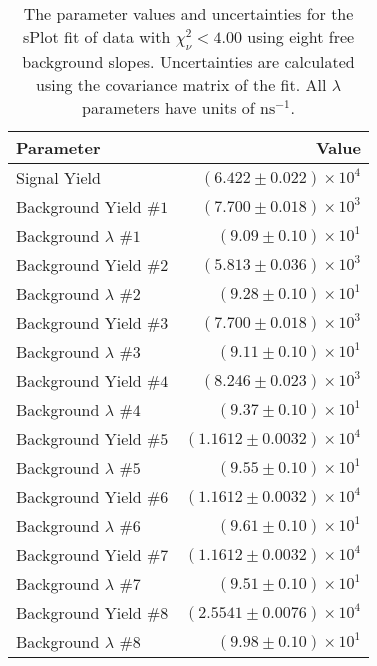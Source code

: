 
\begin{table}[ht]
    \begin{center}
        \begin{tabular}{lr}\toprule
            Parameter & Value \\\midrule
            Signal Yield & $(6.422 \pm 0.022) \times 10^{4}$ \\
            Background Yield $\#1$ & $(7.700 \pm 0.018) \times 10^{3}$ \\
            Background $\lambda$ $\#1$ & $(9.09 \pm 0.10) \times 10^{1}$ \\
            Background Yield $\#2$ & $(5.813 \pm 0.036) \times 10^{3}$ \\
            Background $\lambda$ $\#2$ & $(9.28 \pm 0.10) \times 10^{1}$ \\
            Background Yield $\#3$ & $(7.700 \pm 0.018) \times 10^{3}$ \\
            Background $\lambda$ $\#3$ & $(9.11 \pm 0.10) \times 10^{1}$ \\
            Background Yield $\#4$ & $(8.246 \pm 0.023) \times 10^{3}$ \\
            Background $\lambda$ $\#4$ & $(9.37 \pm 0.10) \times 10^{1}$ \\
            Background Yield $\#5$ & $(1.1612 \pm 0.0032) \times 10^{4}$ \\
            Background $\lambda$ $\#5$ & $(9.55 \pm 0.10) \times 10^{1}$ \\
            Background Yield $\#6$ & $(1.1612 \pm 0.0032) \times 10^{4}$ \\
            Background $\lambda$ $\#6$ & $(9.61 \pm 0.10) \times 10^{1}$ \\
            Background Yield $\#7$ & $(1.1612 \pm 0.0032) \times 10^{4}$ \\
            Background $\lambda$ $\#7$ & $(9.51 \pm 0.10) \times 10^{1}$ \\
            Background Yield $\#8$ & $(2.5541 \pm 0.0076) \times 10^{4}$ \\
            Background $\lambda$ $\#8$ & $(9.98 \pm 0.10) \times 10^{1}$ \\\bottomrule
        \end{tabular}
        \caption{The parameter values and uncertainties for the sPlot fit of data with $\chi^2_\nu < 4.00$ using eight free background slopes. Uncertainties are calculated using the covariance matrix of the fit. All $\lambda$ parameters have units of $\si{\nano\second}^{-1}$.}\label{tab:splot-fit-results-chisqdof-4.00-free-8}
    \end{center}
\end{table}
